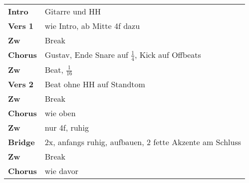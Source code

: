 
\begin{tabular}{p{1.6cm}l}
	\textbf{Intro}  & Gitarre und HH                                          \\
	\textbf{Vers 1} & wie Intro, ab Mitte 4f dazu                             \\
	\textbf{Zw}     & Break                                                   \\
	\textbf{Chorus} & Gustav, Ende Snare auf $\frac{1}{4}$, Kick auf Offbeats \\
	\textbf{Zw}     & Beat, $\frac{1}{16}$                                    \\
	\textbf{Vers 2} & Beat ohne HH auf Standtom                               \\
	\textbf{Zw}     & Break                                                   \\
	\textbf{Chorus} & wie oben                                                \\
	\textbf{Zw}     & nur 4f, ruhig                                           \\
	\textbf{Bridge} & 2x, anfangs ruhig, aufbauen, 2 fette Akzente am Schluss \\
	\textbf{Zw}     & Break                                                   \\
	\textbf{Chorus} & wie davor                                               \\
\end{tabular}
